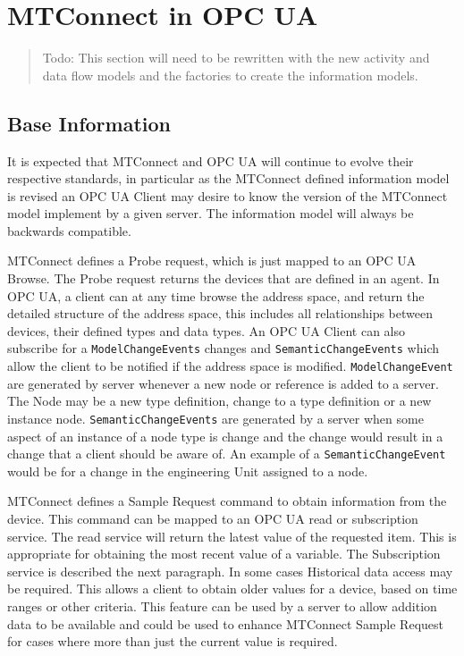 \section{MTConnect in OPC UA}

\begin{quote}
    \color{red}
    Todo: This section will need to be rewritten with the new activity and data flow models and the factories to create the information models.
\end{quote}

\subsection{Base Information}

It is expected that MTConnect and OPC UA will continue to evolve their respective standards, in particular as the MTConnect defined information model is revised an OPC UA Client may desire to know the version of the MTConnect model implement by a given server. The information model will always be backwards compatible.

MTConnect defines a Probe request, which is just mapped to an OPC UA Browse. The Probe request returns the devices that are defined in an agent. In OPC UA, a client can at any time browse the address space, and return the detailed structure of the address space, this includes all relationships between devices, their defined types and data types. An OPC UA Client can also subscribe for a \texttt{ModelChangeEvents} changes and \texttt{SemanticChangeEvents} which allow the client to be notified if the address space is modified. \texttt{ModelChangeEvent} are generated by server whenever a new node or reference is added to a server. The Node may be a new type definition, change to a type definition or a new instance node. \texttt{SemanticChangeEvents} are generated by a server when some aspect of an instance of a node type is change and the change would result in a change that a client should be aware of. An example of a \texttt{SemanticChangeEvent} would be for a change in the engineering Unit assigned to a node.

MTConnect defines a Sample Request command to obtain information from the device. This command can be mapped to an OPC UA read or subscription service. The read service will return the latest value of the requested item. This is appropriate for obtaining the most recent value of a variable. The Subscription service is described the next paragraph. In some cases Historical data access may be required. This allows a client to obtain older values for a device, based on time ranges or other criteria. This feature can be used by a server to allow addition data to be available and could be used to enhance MTConnect Sample Request for cases where more than just the current value is required.

